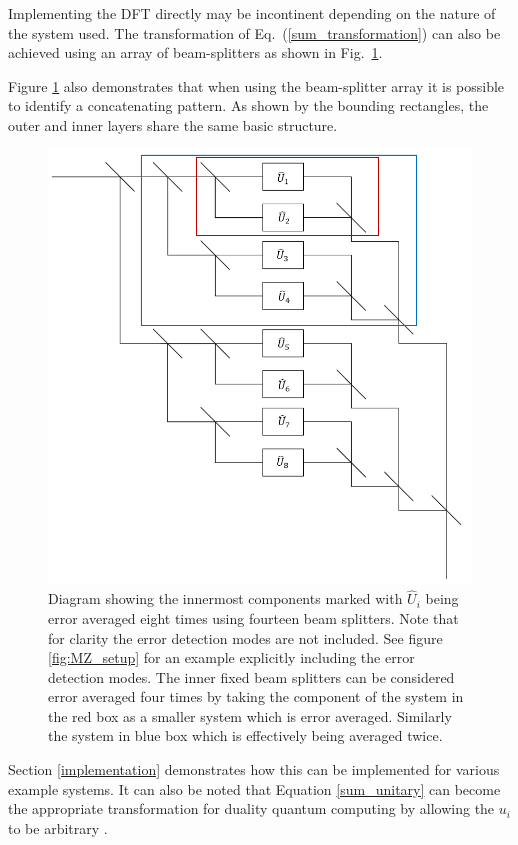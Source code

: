 \documentclass[aps,pra,twocolumn,superscriptaddress,numerical]{revtex4-1}
\begin{document}
Implementing the DFT directly may be incontinent depending on the nature of the system used.  The transformation of Eq.~(\ref{sum_transformation}) can also be achieved using an array of beam-splitters as shown in Fig.~\ref{fig:gen system}. 

Figure \ref{fig:gen system} also demonstrates that when using the beam-splitter array it is possible to identify a concatenating pattern.  As shown by the bounding rectangles, the outer and inner layers share the same basic structure. 
%
\begin{figure}
	\includegraphics[width=\columnwidth]{unitaries.PNG}
	\caption{\label{fig:gen system}Diagram showing the innermost components marked with $\hat{U}_i$ being error averaged eight times using fourteen beam splitters. Note that for clarity the error detection modes are not included. See figure \ref{fig:MZ_setup} for an example explicitly including the error detection modes. The inner fixed beam splitters can be considered error averaged four times by taking the component of the system in the red box as a smaller system which is error averaged. Similarly the system in blue box which is effectively being averaged twice.}
\end{figure}
Section \ref{implementation} demonstrates how this can be implemented for various example systems. It can also be noted that Equation \ref{sum_unitary} can become the appropriate transformation for duality quantum computing by allowing the $u_{i}$ to be arbitrary \cite{dualityQC}.
\end{document}

